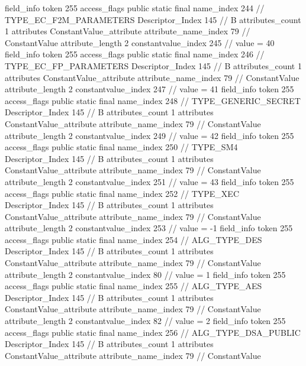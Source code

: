 {{{{{{{				}
				}
			}
			field_info {
				token	255
				access_flags	public static final
				name_index	244		// TYPE_EC_F2M_PARAMETERS
				Descriptor_Index	145		// B
				attributes_count	1
				attributes {
				ConstantValue_attribute {
					attribute_name_index	79		// ConstantValue
					attribute_length	2
					constantvalue_index	245		// value = 40
				}
				}
			}
			field_info {
				token	255
				access_flags	public static final
				name_index	246		// TYPE_EC_FP_PARAMETERS
				Descriptor_Index	145		// B
				attributes_count	1
				attributes {
				ConstantValue_attribute {
					attribute_name_index	79		// ConstantValue
					attribute_length	2
					constantvalue_index	247		// value = 41
				}
				}
			}
			field_info {
				token	255
				access_flags	public static final
				name_index	248		// TYPE_GENERIC_SECRET
				Descriptor_Index	145		// B
				attributes_count	1
				attributes {
				ConstantValue_attribute {
					attribute_name_index	79		// ConstantValue
					attribute_length	2
					constantvalue_index	249		// value = 42
				}
				}
			}
			field_info {
				token	255
				access_flags	public static final
				name_index	250		// TYPE_SM4
				Descriptor_Index	145		// B
				attributes_count	1
				attributes {
				ConstantValue_attribute {
					attribute_name_index	79		// ConstantValue
					attribute_length	2
					constantvalue_index	251		// value = 43
				}
				}
			}
			field_info {
				token	255
				access_flags	public static final
				name_index	252		// TYPE_XEC
				Descriptor_Index	145		// B
				attributes_count	1
				attributes {
				ConstantValue_attribute {
					attribute_name_index	79		// ConstantValue
					attribute_length	2
					constantvalue_index	253		// value = -1
				}
				}
			}
			field_info {
				token	255
				access_flags	public static final
				name_index	254		// ALG_TYPE_DES
				Descriptor_Index	145		// B
				attributes_count	1
				attributes {
				ConstantValue_attribute {
					attribute_name_index	79		// ConstantValue
					attribute_length	2
					constantvalue_index	80		// value = 1
				}
				}
			}
			field_info {
				token	255
				access_flags	public static final
				name_index	255		// ALG_TYPE_AES
				Descriptor_Index	145		// B
				attributes_count	1
				attributes {
				ConstantValue_attribute {
					attribute_name_index	79		// ConstantValue
					attribute_length	2
					constantvalue_index	82		// value = 2
				}
				}
			}
			field_info {
				token	255
				access_flags	public static final
				name_index	256		// ALG_TYPE_DSA_PUBLIC
				Descriptor_Index	145		// B
				attributes_count	1
				attributes {
				ConstantValue_attribute {
					attribute_name_index	79		// ConstantValue
}}}}}}}
